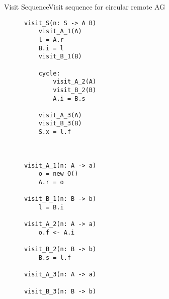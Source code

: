 \begin{frame}[fragile=singleslide]{Visit Sequence}{Visit sequence for circular remote AG}

{\scriptsize
\begin{figure}[htbp]
    \centering
\begin{multicols}{2}
\begin{verbatim}
visit_S(n: S -> A B)
    visit_A_1(A)
    l = A.r
    B.i = l
    visit_B_1(B)

    cycle:
        visit_A_2(A)
        visit_B_2(B)
        A.i = B.s

    visit_A_3(A)
    visit_B_3(B)
    S.x = l.f



visit_A_1(n: A -> a)
    o = new O()
    A.r = o

visit_B_1(n: B -> b)
    l = B.i

visit_A_2(n: A -> a)
    o.f <- A.i

visit_B_2(n: B -> b)
    B.s = l.f

visit_A_3(n: A -> a)

visit_B_3(n: B -> b)

\end{verbatim}
\end{multicols}
\end{figure}
}

\end{frame}

